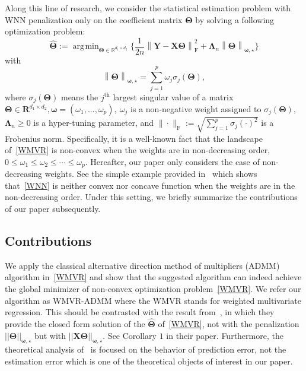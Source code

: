 \documentclass[12pt]{article}
\DeclareMathOperator*{\argmin}{\arg\!\min}
\begin{document}
Along this line of research, we consider the statistical estimation problem with WNN penalization only on the coefficient matrix $\boldsymbol{\Theta}$ by solving a following optimization problem:
\begin{equation}  \label{WMVR}
    \widehat{\boldsymbol{\Theta}} := \argmin_{\boldsymbol{\Theta}\in\mathbb{R}^{d_{1}\times d_{2}}} \bigg\{ \frac{1}{2n} \left\| \boldsymbol{Y}-\boldsymbol{X}\boldsymbol{\Theta} \right\|_{\text{F}}^{2} + \boldsymbol{\Lambda}_{n} \left\| \boldsymbol{\Theta}\right\|_{\boldsymbol{\omega,\star}} \bigg\}
\end{equation}
with 
\begin{equation} \label{WNN}
     \left\| \boldsymbol{\Theta} \right\|_{\boldsymbol{\omega,\star}} =\sum^{p}_{j=1} \omega_{j}\sigma_{j}(\boldsymbol{\Theta}),
\end{equation}
where $\sigma_{j}(\boldsymbol{\Theta})$ means the $j^{\text{th}}$ largest singular value of a matrix $\boldsymbol{\Theta} \in \boldsymbol{R}^{d_{1} \times d_{2}}, \boldsymbol{\omega} = (\omega_{1}, ..., \omega_{p}),\ \omega_{j}$ is a non-negative weight assigned to $\sigma_{j}(\boldsymbol{\Theta})$, $\boldsymbol{\Lambda}_{n}\geq 0$ is a hyper-tuning parameter, and $\| \cdot \|_{\text{F}}:=\sqrt{\sum_{j=1}^{p}\sigma_{j}(\cdot)^{2}}$ is a Frobenius norm.
Specifically, it is a well-known fact that the landscape of~\eqref{WMVR} is non-convex when the weights are in non-decreasing order, $0\leq\omega_{1}\leq\omega_{2}\leq\cdots\leq\omega_{p}$. 
Hereafter, our paper only considers the case of non-decreasing weights.
See the simple example provided in~\citet{chen2013reduced} which shows that~\eqref{WNN} is neither convex nor concave function when the weights are in the non-decreasing order.
Under this setting, we briefly summarize the contributions of our paper subsequently.

\subsection{Contributions}
We apply the classical alternative direction method of multipliers (ADMM) algorithm in~\eqref{WMVR} and show that the suggested algorithm can indeed achieve the global minimizer of non-convex optimization problem~\eqref{WMVR}.
We refer our algorithm as WMVR-ADMM where the WMVR stands for weighted multivariate regression.
This should be contrasted with the result from~\citet{chen2013reduced}, in which they provide the closed form solution of the $\widehat{\boldsymbol{\Theta}}$ of~\eqref{WMVR}, not with the penalization $||\boldsymbol{\Theta}||_{\boldsymbol{\omega,\star}}$ but with $||\boldsymbol{X\Theta}||_{\boldsymbol{\omega,\star}}$.
See Corollary $1$ in their paper.
Furthermore, the theoretical analysis of~\citet{chen2013reduced} is focused on the behavior of prediction error, not the estimation error which is one of the theoretical objects of interest in our paper.
\end{document}
